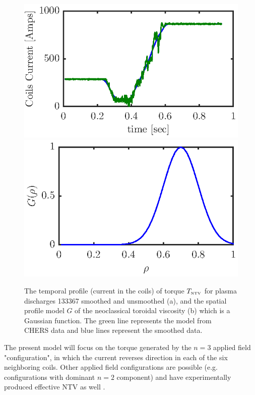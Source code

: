 \documentclass[12pt]{iopart}
\begin{document}
\begin{figure}
	\centering
	\includegraphics{imene_figs/fig7a}  %
	\includegraphics{imene_figs/fig7b}  %
	\caption{The temporal profile (current  in the coils) of torque $T_\textrm{\tiny{NTV}}$ for plasma discharges 133367 smoothed and unsmoothed (a), and the  spatial profile model $G$ of the neoclassical toroidal viscosity (b)  which is a Gaussian function. The green line represents the model from CHERS data and  blue lines represent the smoothed data.}
	\label{fig:current}
\end{figure}
The present model  will focus on the torque generated by the $n=3$ applied field "configuration", in which the current reverses direction in each of the six neighboring coils. Other applied field configurations are possible (e.g. configurations with dominant $n = 2$ component) and have experimentally produced effective NTV as well \cite{Sabbagh10}.
 
\end{document}
